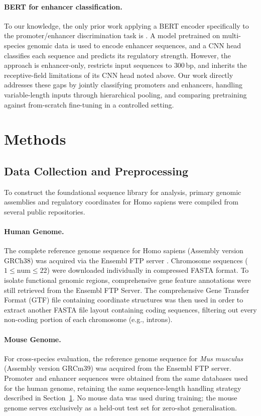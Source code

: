 \documentclass[11pt,a4paper,twoside]{article}
\begin{document}
\paragraph{BERT for enhancer classification.} To our knowledge, the only prior work applying a BERT encoder specifically to the promoter/enhancer discrimination task is \cite{rivals}. A model pretrained on multi-species genomic data is used to encode enhancer sequences, and a CNN head classifies each sequence and predicts its regulatory strength. However, the approach is enhancer-only, restricts input sequences to $300$\,bp, and inherits the receptive-field limitations of its CNN head noted above. Our work directly addresses these gaps by jointly classifying promoters and enhancers, handling variable-length inputs through hierarchical pooling, and comparing pretraining against from-scratch fine-tuning in a controlled setting.

\section{Methods}
\label{sec:methods}

\subsection{Data Collection and Preprocessing}
To construct the foundational sequence library for analysis, primary genomic assemblies and regulatory coordinates for Homo sapiens were compiled from several public repositories.

\paragraph{Human Genome.}
The complete reference genome sequence for Homo sapiens (Assembly version GRCh38) was acquired via the Ensembl FTP server \cite{ensembl}. 
Chromosome sequences ($1 \le \text{num} \le 22$) were downloaded individually in compressed FASTA format.
To isolate functional genomic regions, comprehensive gene feature annotations were still retrieved from the Ensembl FTP Server.
The comprehensive Gene Transfer Format (GTF) file containing coordinate structures was then used in order to extract another FASTA file layout containing coding sequences, filtering out every non-coding portion of each chromosome (e.g., introns).

\paragraph{Mouse Genome.}
For cross-species evaluation, the reference genome sequence for \textit{Mus musculus} (Assembly version GRCm39) was acquired from the Ensembl FTP server.
Promoter and enhancer sequences were obtained from the same databases used for the human genome, retaining the same sequence-length handling strategy described in Section~\ref{sec:methods}.
No mouse data was used during training; the mouse genome serves exclusively as a held-out test set for zero-shot generalisation.
\end{document}
